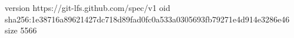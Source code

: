 version https://git-lfs.github.com/spec/v1
oid sha256:1e38716a89621427dc718d89fad0fc0a533a0305693fb79271e4d914e3286e46
size 5566
